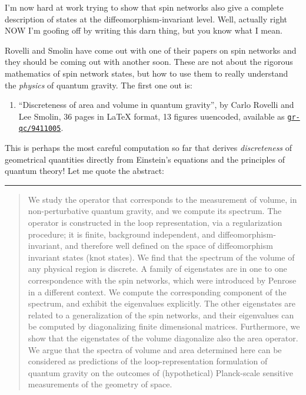 \documentclass{article}
\def\tightlist{}
\begin{document}
I'm now hard at work trying to show that spin networks also give a
complete description of states at the diffeomorphism-invariant level.
Well, actually right NOW I'm goofing off by writing this darn thing, but
you know what I mean.

Rovelli and Smolin have come out with one of their papers on spin
networks and they should be coming out with another soon. These are not
about the rigorous mathematics of spin network states, but how to use
them to really understand the \emph{physics} of quantum gravity. The
first one out is:

\begin{enumerate}
\def\labelenumi{\arabic{enumi})}
\setcounter{enumi}{5}
\tightlist
\item
  ``Discreteness of area and volume in quantum gravity'', by Carlo
  Rovelli and Lee Smolin, 36 pages in LaTeX format, 13 figures
  uuencoded, available as
  \href{http://xxx.lanl.gov/abs/gr-qc/9411005}{\texttt{gr-qc/9411005}}.
\end{enumerate}

This is perhaps the most careful computation so far that derives
\emph{discreteness} of geometrical quantities directly from Einstein's
equations and the principles of quantum theory! Let me quote the
abstract:

\begin{center}\rule{0.5\linewidth}{0.5pt}\end{center}

\begin{quote}
We study the operator that corresponds to the measurement of volume, in
non-perturbative quantum gravity, and we compute its spectrum. The
operator is constructed in the loop representation, via a regularization
procedure; it is finite, background independent, and
diffeomorphism-invariant, and therefore well defined on the space of
diffeomorphism invariant states (knot states). We find that the spectrum
of the volume of any physical region is discrete. A family of
eigenstates are in one to one correspondence with the spin networks,
which were introduced by Penrose in a different context. We compute the
corresponding component of the spectrum, and exhibit the eigenvalues
explicitly. The other eigenstates are related to a generalization of the
spin networks, and their eigenvalues can be computed by diagonalizing
finite dimensional matrices. Furthermore, we show that the eigenstates
of the volume diagonalize also the area operator. We argue that the
spectra of volume and area determined here can be considered as
predictions of the loop-representation formulation of quantum gravity on
the outcomes of (hypothetical) Planck-scale sensitive measurements of
the geometry of space.
\end{quote}
\end{document}
